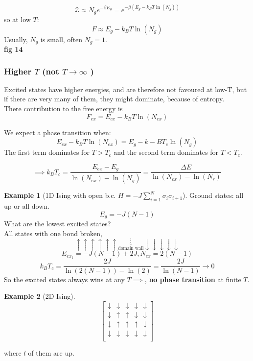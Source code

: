 \documentclass[11pt]{book}
\theoremstyle{definition}
\newtheorem{example}{Example}[section]
\begin{document}
\[ \mathcal{Z} \approx N_g e^{-\beta E_g} = e^{-\beta(E_g -k_BT \ln(N_g) )}\] 
so at low $ T $:
\[ F \approx E_g -k_BT \ln(N_g)  \] 
Usually, $ N_g $ is small, often $ N_g = 1 $. \\
{\color{red} \textbf{fig 14}  } 

\subsubsection{Higher $T$ (not $ T \to \infty $ )}
Excited states have higher energies, and are therefore not favoured at low-T, but if there are very many of them, they might dominate, because of entropy. \\
There contribution to the free energy is
\[ F_{ex} = E_{ex} -k_BT \ln(N_{ex}) \] 

We expect a phase transition when: 
\[ E_{ex} -k_BT\ln(N_{ex}) = E_g - k-BT_c\ln(N_g)  \] 
The first term dominates for $ T > T_c $ and the second term dominates for $ T < T_c $. 
\begin{shaded*}

\[ \implies k_BT_c = \frac{E_{ex}-E_g}{\ln(N_{ex}) - \ln(N_g) } = \frac{\Delta E}{\ln(N_{ex})-\ln(N_r) }\] 	

\end{shaded*}
\begin{example}[1D Ising with open b.c. $ H = -J \sum_{i=1}^N \sigma_i \sigma_{i+1}$]
	Ground states: all up or  all down. \\
	\[E_g = -J(N-1)\]
	What are the lowest excited states? \\
	All states with one bond broken, 
\[ \uparrow \uparrow\uparrow\uparrow\uparrow\uparrow \underbrace{\vdots}_{\text{domain wall}}\downarrow \downarrow\downarrow\downarrow\downarrow \]
	\[ E_{ex_1} = -J(N-1) + 2J, N_{ex} = 2(N-1)\] 
	\[ k_BT_c = \frac{2J}{\ln(2(N-1)) -\ln(2) } = \frac{2J}{\ln(N-1) } \to 0 \] 
	So the excited states always wins at any $ T \implies $, \textbf{no phase transition} at finite $ T $.
\end{example}

	\newcommand{\da}{\downarrow} 
	\newcommand{\ua}{\uparrow} 

\begin{example}[2D Ising]
\[ \begin{bmatrix}
	\da & \da & \da & \da  & \da \\
	\da & \ua & \ua & \da  & \da \\
	\da & \ua & \ua & \ua  & \da \\
	\da & \da & \da & \da  & \da \\
\end{bmatrix} \] 
\end{example}
where $ l $ of them are up.\\
\end{document}
